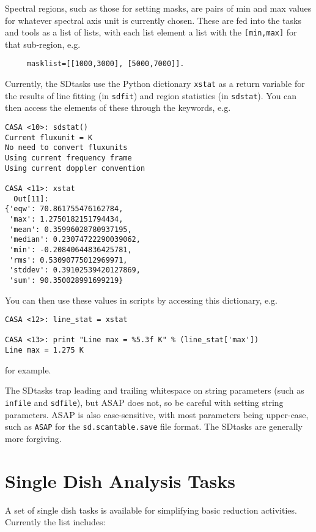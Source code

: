 Spectral regions, such as those for setting masks, are pairs of
min and max values for whatever spectral axis unit is currently
chosen.  These are fed into the tasks and tools as a list of lists,
with each list element a list with the {\tt [min,max]} for that
sub-region, e.g.
\small
\begin{verbatim}
     masklist=[[1000,3000], [5000,7000]].
\end{verbatim}
\normalsize

Currently, the SDtasks use the Python dictionary {\tt xstat} as
a return variable for the results of line fitting (in {\tt sdfit})
and region statistics (in {\tt sdstat}).  You can then access the
elements of these through the keywords, e.g.
\small
\begin{verbatim}
CASA <10>: sdstat()
Current fluxunit = K
No need to convert fluxunits
Using current frequency frame
Using current doppler convention

CASA <11>: xstat
  Out[11]: 
{'eqw': 70.861755476162784,
 'max': 1.2750182151794434,
 'mean': 0.35996028780937195,
 'median': 0.23074722290039062,
 'min': -0.20840644836425781,
 'rms': 0.53090775012969971,
 'stddev': 0.39102539420127869,
 'sum': 90.350028991699219}
\end{verbatim}
\normalsize
You can then use these values in scripts by accessing this dictionary,
e.g.
\small
\begin{verbatim}
CASA <12>: line_stat = xstat

CASA <13>: print "Line max = %5.3f K" % (line_stat['max'])
Line max = 1.275 K
\end{verbatim}
\normalsize
for example.

The SDtasks trap leading and trailing whitespace on string parameters
(such as {\tt infile} and {\tt sdfile}), but ASAP does not, so be
careful with setting string parameters.  ASAP is also case-sensitive,
with most parameters being upper-case, such as {\tt ASAP} for the
{\tt sd.scantable.save} file format.  The SDtasks are generally
more forgiving.

\section{Single Dish Analysis Tasks}
\label{section:sd.sdtasks}

A set of single dish tasks is available for simplifying basic
reduction activities. Currently the list includes:

